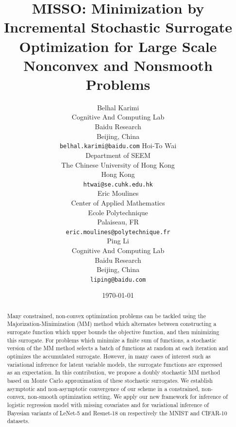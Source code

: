 \documentclass[11pt]{article}
\theoremstyle{t}
\begin{document}
\title{\vspace{-0.1in}MISSO: Minimization by Incremental Stochastic Surrogate Optimization for Large Scale Nonconvex and Nonsmooth Problems\vspace{-0.1in}}

\author{
  Belhal Karimi \\
  Cognitive And Computing Lab\\
  Baidu Research\\
  Beijing, China \\
  \texttt{belhal.karimi@baidu.com} 
   \And
   Hoi-To Wai \\
   Department of SEEM\\
   The Chinese University of Hong Kong\\
   Hong Kong \\
   \texttt{htwai@se.cuhk.edu.hk} \\
   \And
   Eric Moulines \\
   Center of Applied Mathematics\\
   Ecole Polytechnique\\
   Palaiseau, FR \\
   \texttt{eric.moulines@polytechnique.fr} \\
   \And
  Ping Li \\
  Cognitive And Computing Lab\\
  Baidu Research\\
  Beijing, China \\
  \texttt{liping@baidu.com} \\
}

\date{\today}

\maketitle

\begin{abstract}\vspace{-0.1in}
Many constrained, non-convex optimization problems can be tackled using the Majorization-Minimization (MM) method which alternates between constructing a surrogate function which upper bounds the objective function, and then minimizing this surrogate.
For problems which minimize a finite sum of functions, a stochastic version of the MM method selects a batch of functions at random at each iteration and optimizes the accumulated surrogate.
However, in many cases of interest such as  variational inference for latent variable models, the surrogate functions are expressed as an expectation. In this contribution, we propose a doubly stochastic MM method based on Monte Carlo approximation of these stochastic surrogates.
We establish asymptotic and non-asymptotic convergence of our scheme in a constrained, non-convex, non-smooth optimization setting.
We apply our new framework for inference of logistic regression model with missing covariates and for variational inference of Bayesian variants of LeNet-5 and Resnet-18 on respectively the MNIST and CIFAR-10 datasets.
\end{abstract}
\end{document}
